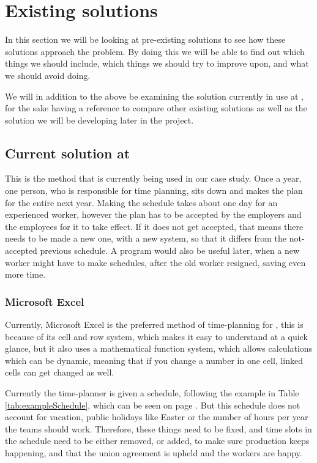 \section{Existing solutions}
In this section we will be looking at pre-existing solutions to see how these solutions approach the problem. By doing this we will be able to find out which things we should include, which things we should try to improve upon, and what we should avoid doing.

We will in addition to the above be examining the solution currently in use at \siemens, for the sake having a reference to compare other existing solutions as well as the solution we will be developing later in the project.

\subsection{Current solution at \siemens}
This is the method that is currently being used in our case study. Once a year, one person, who is responsible for time planning, sits down and makes the plan for the entire next year. Making the schedule takes about one day for an experienced worker, however the plan has to be accepted by the employers and the employees for it to take effect. If it does not get accepted, that means there needs to be made a new one, with a new system, so that it differs from the not-accepted previous schedule. A program would also be useful later, when a new worker might have to make schedules, after the old worker resigned, saving even more time.



\subsubsection{Microsoft Excel}
Currently, Microsoft Excel is the preferred method of time-planning for \siemens, this is because of its cell and row system, which makes it easy to understand at a quick glance, but it also uses a mathematical function system, which allows calculations which can be dynamic, meaning that if you change a number in one cell, linked cells can get changed as well.

Currently the time-planner is given a schedule, following the example in Table \ref{tab:exampleSchedule}, which can be seen on page \pageref{tab:exampleSchedule}. But this schedule does not account for vacation, public holidays like Easter or the number of hours per year the teams should work. Therefore, these things need to be fixed, and time slots in the schedule need to be either removed, or added, to make sure production keeps happening, and that the union agreement is upheld and the workers are happy.

